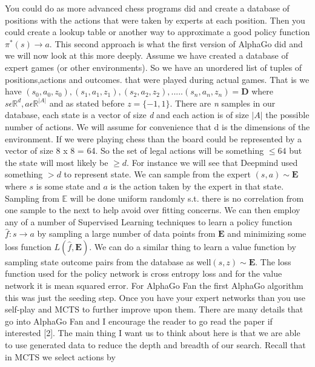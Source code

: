     You could do as more advanced chess programs did and create a database of positions with the actions that were taken by experts at each position. Then you could create a lookup table or another way to approximate a good policy function $ \pi^{*}(s) \rightarrow a $. This second approach is what the first version of AlphaGo did and we will now look at this more deeply. 
    Assume we have created a database of expert games (or other environments). So we have an unordered list of tuples of positions,actions and outcomes. that were played during actual games. That is we have $ (s_{0}, a_{0}, z_{0}), (s_{1}, a_{1}, z_{1}), (s_{2}, a_{2}, z_{2}),..... (s_{n}, a_{n}, z_{n}) = \textbf{D}$ where $s \epsilon \mathbb{R}^{d} , a \epsilon \mathbb{R}^{|A|}$ and as stated before $ z= \{-1,1\}$. There are \textit{n} samples in our database, each state is a vector of size \textit{d} and each action is of size $|A|$ the possible number of actions. We will assume for convenience that d is the dimensions of the environment. If we were playing chess than the board could be represented by a vector of size 8 x 8 = 64. So the set of legal actions will be something $ \leq 64 $ but the state will most likely be $
    \geq d $. For instance we will see that Deepmind used something $ > d$ to represent state. 
     We can sample from the expert $ (s,a) \sim \mathbf{E} $ where $ s $ is some state and $a$ is the action taken by the expert in that state. Sampling from $\mathbb{E}$ will be done uniform randomly s.t. there is no correlation from one sample to the next to help avoid over fitting concerns. 
    We can then employ any of a number of Supervised Learning techniques to learn a policy function $ \hat{f}:s \rightarrow a$ by sampling a large number of data points from $\mathbf{E}$ and minimizing some loss function $L(\hat{f}, \mathbf{E})$. We can do a similar thing to learn a value function by sampling state outcome pairs from the database as well$ (s,z) \sim \mathbf{E} $. The loss function used for the policy network is cross entropy loss and for the value network it is mean squared error. For AlphaGo Fan the first AlphaGo algorithm this was just the seeding step. Once you have your expert networks than you use self-play and MCTS to further improve upon them. There are many details that go into AlphaGo Fan and I encourage the reader to go read the paper if interested [2]. The main thing I want us to think about here is that we are able to use generated data to reduce the depth and breadth of our search. Recall that in MCTS we select actions by 
    
